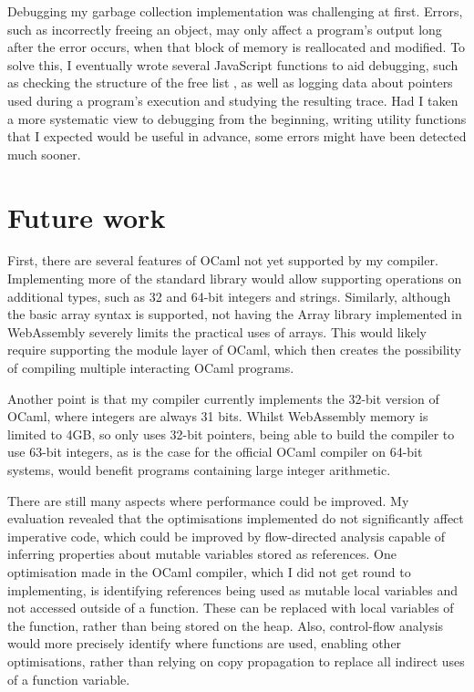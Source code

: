 Debugging my garbage collection implementation was challenging at first.
Errors, such as incorrectly freeing an object, may only affect a program's output long after the error occurs, when that block of memory is reallocated and modified. To solve this, I eventually wrote several JavaScript functions to aid debugging, such as checking the structure of the free list%
, as well as logging data about pointers used during a program's execution and studying the resulting trace. 
Had I taken a more systematic view to debugging from the beginning, writing utility functions that I expected would be useful in advance, some errors might have been detected much sooner.


\section{Future work}
First, there are several features of OCaml not yet supported by my compiler. Implementing more of the standard library would allow supporting operations on additional types, such as 32 and 64-bit integers and strings.
Similarly, although the basic array syntax is supported, not having the Array library implemented in WebAssembly severely limits the practical uses of arrays. This would likely require supporting the module layer of OCaml, which then creates the possibility of compiling multiple interacting OCaml programs.

Another point is that my compiler currently implements the 32-bit version of OCaml, where integers are always 31 bits. 
Whilst WebAssembly memory is limited to 4GB, so only uses 32-bit pointers, being able to build the compiler to use 63-bit integers, as is the case for the official OCaml compiler on 64-bit systems, would benefit programs containing large integer arithmetic.

There are still many aspects where performance could be improved. 
My evaluation revealed that the optimisations implemented do not significantly affect imperative code, which could be improved by flow-directed analysis capable of inferring properties about mutable variables stored as references.
%
One optimisation made in the OCaml compiler, which I did not get round to implementing, is identifying references being used as mutable local variables and not accessed outside of a function. These can be replaced with local variables of the function, rather than being stored on the heap.
Also, control-flow analysis would more precisely identify where functions are used, enabling other optimisations, rather than relying on copy propagation to replace all indirect uses of a function variable.

